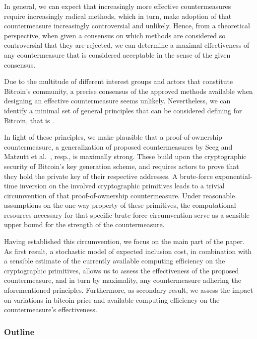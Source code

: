 \documentclass[a4paper,11pt,titlepage]{scrbook}
\begin{document}
In general, we can expect that increasingly more effective countermeasures require increasingly radical methods, which in turn, make adoption of that countermeasure increasingly controversial and unlikely.
Hence, from a theoretical perspective, when given a consensus on which methods are considered so controversial that they are rejected, we can determine a maximal effectiveness of any countermeasure that is considered acceptable in the sense of the given consensus.

Due to the multitude of different interest groups and actors that constitute Bitcoin's community, a precise consensus of the approved methods available when designing an effective countermeasure seems unlikely.
Nevertheless, we can identify a minimal set of general principles that can be considered defining for Bitcoin,
that is .

In light of these principles, we make plausible that a proof-of-ownership countermeasure, a generalization of proposed countermeasures by Seeg \cite{seeg_hardening_2018} and Matzutt et al.~\cite{matzutt_thwarting_2018}, resp., is maximally strong. 
These build upon the cryptographic security of Bitcoin's key generation scheme, and requires actors to prove that they hold the private key of their respective addresses.
A brute-force exponential-time inversion on the involved cryptographic primitives leads to a trivial circumvention of that proof-of-ownership countermeasure.
Under reasonable assumptions on the one-way property of these primitives,
the computational resources necessary for that specific brute-force circumvention serve as a sensible upper bound for the strength of the countermeasure.

Having established this circumvention, we focus on the main part of the paper.
As first result, a stochastic model of expected inclusion cost, in combination with a sensible estimate of the currently available computing efficiency on the cryptographic primitives, allows us to assess the effectiveness of the proposed countermeasure, and in turn by maximality, any countermeasure adhering the aforementioned principles.
Furthermore, as secondary result, we assess the impact on variations in bitcoin price and available computing efficiency on the countermeasure's effectiveness.


\subsubsection*{Outline}
\end{document}
